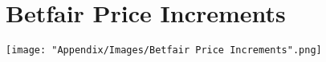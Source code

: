 \chapter{Betfair Price Increments}
	\label{appendix:betfairPriceIncrements}
	\texttt{[image: "Appendix/Images/Betfair Price Increments".png]}